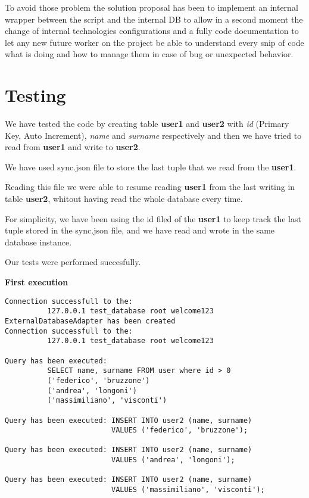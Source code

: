 To avoid those problem the solution proposal has been to implement an internal wrapper between the script and the internal DB to allow in a second moment the change of internal technologies configurations and a fully code documentation to let any new future worker on the project be able to understand every snip of code what is doing and how to manage them in case of bug or unexpected behavior.

\section{Testing}

We have tested the code by creating table \textbf{user1} and \textbf{user2} with \textit{id} (Primary Key, Auto Increment), \textit{name} and \textit{surname} respectively and then we have tried to read from \textbf{user1} and write to \textbf{user2}.

We have used sync.json file to store the last tuple that we read from the \textbf{user1}.

Reading this file we were able to resume reading \textbf{user1} from the last writing in table \textbf{user2}, whitout having read the whole database every time.

For simplicity, we have been using the id filed of the \textbf{user1} to keep track the last tuple stored in the sync.json file, and we have read and wrote in the same database instance.

Our tests were performed succesfully.


\textbf{First execution}
\begin{lstlisting}
Connection successfull to the: 
          127.0.0.1 test_database root welcome123 
ExternalDatabaseAdapter has been created
Connection successfull to the: 
          127.0.0.1 test_database root welcome123 

Query has been executed: 
          SELECT name, surname FROM user where id > 0
          ('federico', 'bruzzone')
          ('andrea', 'longoni')
          ('massimiliano', 'visconti')

Query has been executed: INSERT INTO user2 (name, surname) 
                         VALUES ('federico', 'bruzzone');

Query has been executed: INSERT INTO user2 (name, surname) 
                         VALUES ('andrea', 'longoni');

Query has been executed: INSERT INTO user2 (name, surname) 
                         VALUES ('massimiliano', 'visconti');
\end{lstlisting}


